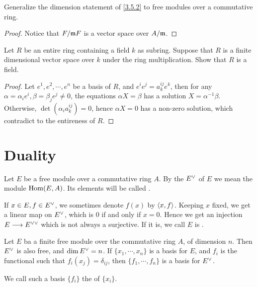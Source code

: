   \begin{ex}
    Generalize the dimension statement of \ref{3.5.2} to free modules over a commutative ring.
  \end{ex}
  \begin{proof}
    Notice that $F/\mathfrak{m} F$ is a vector space over $A/\mathfrak{m}$.
  \end{proof}

  \begin{ex}
    Let $R$ be an entire ring containing a field $k$ as subring. Suppose that $R$ is a finite dimensional vector space over $k$ under the ring multiplication. Show that $R$ is a field.
  \end{ex}
  \begin{proof}
    Let $e^1,e^2,\cdots,e^n$ be a basis of $R$, and $e^ie^j=a^{ij}_ke^k$, then for any $\alpha=\alpha_ie^i,\beta=\beta_je^j\neq0$, the equations $\alpha X=\beta$ has a solution $X=\alpha^{-1}\beta$. Otherwise, $\det(\alpha_ia^{ij}_k)=0$, hence $\alpha X=0$ has a non-zero solution, which contradict to the entireness of $R$.
  \end{proof}

\newpage\section{Duality}
  \begin{defn}
    Let $E$ be a free module over a commutative ring $A$. By the  ${E}^{\vee}$ of $E$ we mean the module $\operatorname{Hom}(E,A)$. Its elements will be called .
  \end{defn}
  \begin{rem}
    If $x\in E,f\in {E}^{\vee}$, we sometimes denote $f(x)$ by $\langle x,f\rangle$. Keeping $x$ fixed, we get a linear map on ${E}^{\vee}$, which is $0$ if and only if $x=0$. Hence we get an injection $E\longrightarrow E^{\vee\vee}$ which is not always a surjective. If it is, we call $E$ is .
  \end{rem}

  \begin{prop}
    Let $E$ ba a finite free module over the commutative ring $A$, of dimension $n$. Then ${E}^{\vee}$ is also free, and $\dim{E}^{\vee}=n$. If $\{x_1,\cdots,x_n\}$ is a basis for $E$, and $f_i$ is the functional such that $f_i(x_j)=\delta_{ij}$, then $\{f_1,\cdots,f_n\}$ is a basis for ${E}^{\vee}$.
  \end{prop}

  We call such a basis $\{f_i\}$ the  of $\{x_i\}$.

